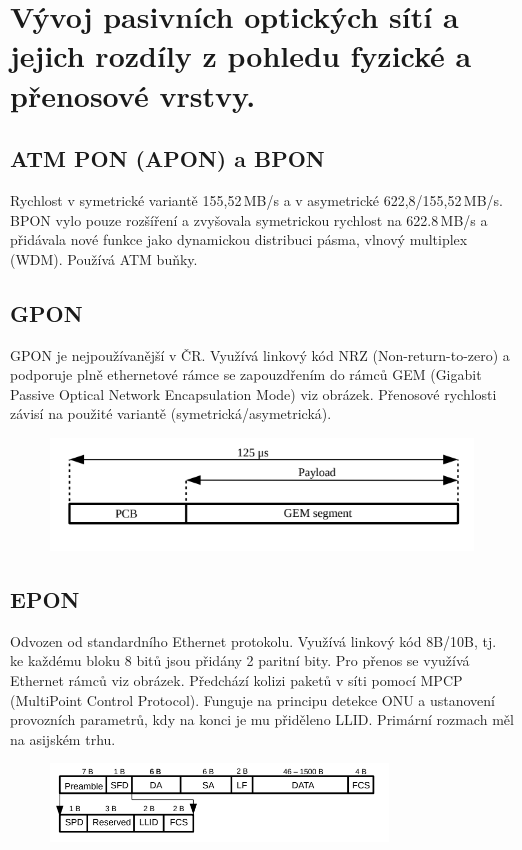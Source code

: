 \clearpage
\section{Vývoj pasivních optických sítí a jejich rozdíly z pohledu fyzické a přenosové vrstvy.}

\subsection{ATM PON (APON) a BPON}
Rychlost v symetrické variantě 155,52\,MB/s a v asymetrické 622,8/155,52\,MB/s. BPON vylo pouze rozšíření a zvyšovala symetrickou rychlost na 622.8\,MB/s a přidávala nové funkce jako dynamickou distribuci pásma, vlnový multiplex (WDM). Používá ATM buňky.

\subsection{GPON}
GPON je nejpoužívanější v ČR. Využívá linkový kód NRZ (Non-return-to-zero) a podporuje plně ethernetové rámce se zapouzdřením do rámců GEM (Gigabit Passive Optical Network Encapsulation Mode) viz obrázek. Přenosové rychlosti závisí na použité variantě (symetrická/asymetrická).

\begin{figure} [h]
    \centering
    \includegraphics[width=\textwidth]{snimky/gemFrame.png}
\end{figure}

\subsection{EPON}
Odvozen od standardního Ethernet protokolu. Využívá linkový kód 8B/10B, tj. ke každému bloku 8 bitů jsou přidány 2 paritní bity. Pro přenos se využívá Ethernet rámců viz obrázek. Předchází kolizi paketů v síti pomocí MPCP (MultiPoint Control Protocol). Funguje na principu detekce ONU a ustanovení provozních parametrů, kdy na konci je mu přiděleno LLID. Primární rozmach měl na asijském trhu.

\begin{figure} [h]
    \centering
    \includegraphics[width=0.8\textwidth]{snimky/EPONframe.png}
\end{figure}

